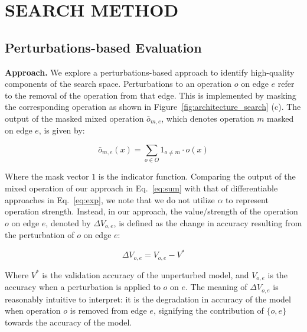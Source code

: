 \documentclass[onecolumn]{IEEEtran}
\begin{document}
\section{SEARCH METHOD}

\subsection{Perturbations-based Evaluation}
\textbf{Approach.} We explore a perturbations-based approach to identify high-quality components of the search space. Perturbations to an operation \( o \) on edge \( e \) refer to the removal of the operation from that edge. This is implemented by masking the corresponding operation as shown in Figure~\ref{fig:architecture_search} (c). The output of the masked mixed operation \( \bar{o}_{m,e} \), which denotes operation \( m \) masked on edge \( e \), is given by:

\begin{equation}
	\bar{o}_{m,e}(x) = \sum_{o \in O} 1_{o \neq m} \cdot o(x)
	\label{eq:sum}
\end{equation}

Where the mask vector \( 1 \) is the indicator function. Comparing the output of the mixed operation of our approach in Eq.~\ref{eq:sum} with that of differentiable approaches in Eq.~\ref{eq:exp}, we note that we do not utilize \( \alpha \) to represent operation strength. Instead, in our approach, the value/strength of the operation \( o \) on edge \( e \), denoted by \( \Delta V_{o,e} \), is defined as the change in accuracy resulting from the perturbation of \( o \) on edge \( e \):

\begin{equation}
	\Delta V_{o,e} = V_{o,e} - V^*
	\label{eq:validation}
\end{equation}

Where \( V^* \) is the validation accuracy of the unperturbed model, and \( V_{o,e} \) is the accuracy when a perturbation is applied to \( o \) on \( e \). The meaning of \( \Delta V_{o,e} \) is reasonably intuitive to interpret: it is the degradation in accuracy of the model when operation \( o \) is removed from edge \( e \), signifying the contribution of \( \{o,e\} \) towards the accuracy of the model.
\end{document}
